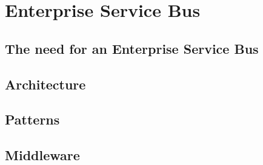 \chapter{Enterprise Service Bus}
\label{cha:esb}

\section{The need for an Enterprise Service Bus}
\label{sec:esb-need-for-esb}

\section{Architecture}
\label{sec:esb-architecture}

\section{Patterns}
\label{sec:esb-patterns}

\section{Middleware}
\label{sec:esb-middleware}